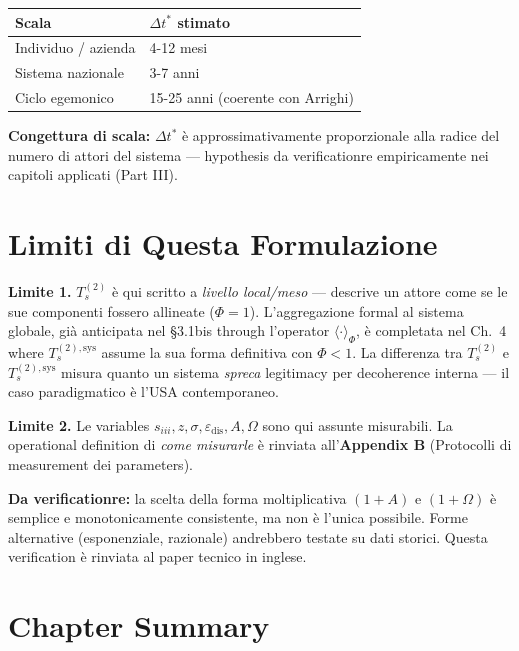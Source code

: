 {\def\LTcaptype{none} %
{\small\begin{longtable}[]{@{}ll@{}}
\toprule\noalign{}
Scala & \(\Delta t^*\) stimato \\
\midrule\noalign{}
\endhead
\bottomrule\noalign{}
\endlastfoot
Individuo / azienda & 4-12 mesi \\
Sistema nazionale & 3-7 anni \\
Ciclo egemonico & 15-25 anni (coerente con Arrighi) \\
\end{longtable}}
}

\Conj{} \textbf{Congettura di scala:} \(\Delta t^*\) è
approssimativamente proporzionale alla radice del numero di attori del
sistema --- hypothesis da verificationre empiricamente nei capitoli applicati
(Part III).



\section{Limiti di Questa
Formulazione}\label{limiti-di-questa-formulazione}

\Conj{} \textbf{Limite 1.} \(T_s^{(2)}\) è qui scritto a \emph{livello
local/meso} --- descrive un attore come se le sue componenti fossero
allineate (\(\Phi = 1\)). L'aggregazione formal al sistema globale, già
anticipata nel \S{}3.1bis through l'operator \(\langle\cdot\rangle_\Phi\),
è completata nel Ch.~4 where \(T_s^{(2),\text{sys}}\) assume la sua
forma definitiva con \(\Phi < 1\). La differenza tra \(T_s^{(2)}\) e
\(T_s^{(2),\text{sys}}\) misura quanto un sistema \emph{spreca}
legitimacy per decoherence interna --- il caso paradigmatico è l'USA
contemporaneo.

\Conj{} \textbf{Limite 2.} Le variables
\(s_{iii}, z, \sigma, \varepsilon_{\text{dis}}, A, \Omega\) sono qui
assunte misurabili. La operational definition di \emph{come misurarle} è
rinviata all'\textbf{Appendix B} (Protocolli di measurement dei
parameters).

\ToVerify{} \textbf{Da verificationre:} la scelta della forma moltiplicativa
\((1+A)\) e \((1+\Omega)\) è semplice e monotonicamente consistente, ma
non è l'unica possibile. Forme alternative (esponenziale, razionale)
andrebbero testate su dati storici. Questa verification è rinviata al paper
tecnico in inglese.



\section{Chapter Summary}\label{sintesi-del-chapter}

